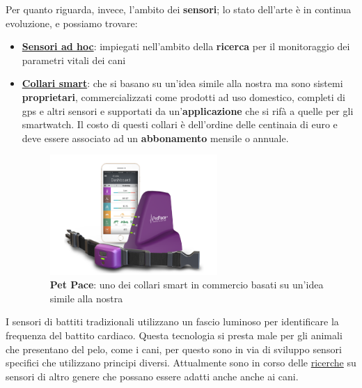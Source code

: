 Per quanto riguarda, invece, l'ambito dei \textbf{sensori}; lo stato dell'arte è in continua evoluzione, e possiamo trovare:
\begin{itemize}
    \item \textbf{\href{https://ciigar.csc.ncsu.edu/files/bib/Brugarolas2015-DogHeartMonitor.pdf}{Sensori ad hoc}}: impiegati nell'ambito della \textbf{ricerca} per il monitoraggio dei parametri vitali dei cani
    \item \textbf{\href{https://petpace.com/}{Collari smart}}: che si basano su un'idea simile alla nostra ma sono sistemi \textbf{proprietari}, commercializzati come prodotti ad uso domestico, completi di gps e altri sensori e supportati da un'\textbf{applicazione} che si rifà a quelle per gli smartwatch. Il costo di questi collari è dell'ordine delle centinaia di euro e deve essere associato ad un \textbf{abbonamento} mensile o annuale. 
    
    \begin{figure}[H]
        \label{fig:PetPace}
        \centering
        \includegraphics[width=0.6\textwidth]{Images/petpace.png}
         \caption{\textbf{Pet Pace}: uno dei collari smart in commercio basati su un'idea simile alla nostra}
    \end{figure}
\end{itemize}



I sensori di battiti tradizionali utilizzano un fascio luminoso per identificare la frequenza del battito cardiaco. Questa tecnologia si presta male per gli animali che presentano del pelo, come i cani, per questo sono in via di sviluppo sensori specifici che utilizzano principi diversi. Attualmente sono in corso delle
\href{https://vcs.vetmed.wsu.edu/research/clinical-studies/clinincal-studies-detail/vcs-clinical-studies/2017/06/28/new-ecg-technology}{ricerche} su sensori di altro genere che possano essere adatti anche anche ai cani.


